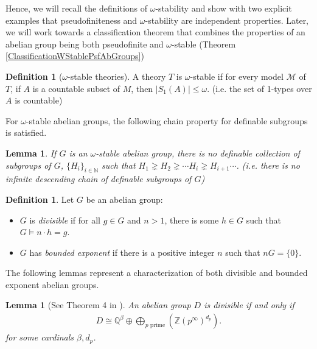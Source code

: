 \documentclass[11pt]{amsart}
\newtheorem{lema}[prop]{Lemma}
\theoremstyle{definition}
\newtheorem{definicion}[prop]{Definition}
\newcommand{\bd}{\begin{definicion}}
\newcommand{\ed}{\end{definicion}}
\newcommand{\bl}{\begin{lema}}
\newcommand{\el}{\end{lema}}
\begin{document}
Hence, we will recall the definitions of $\omega$-stability and show with two explicit examples that pseudofiniteness and $\omega$-stability are independent properties. Later, we will work towards a classification theorem that combines the properties of an abelian group being both pseudofinite and $\omega$-stable (Theorem \ref{ClassificationWStablePsfAbGroups})
\bd[$\omega$-stable theories] A theory $T$ is $\omega$-stable if for every model $\mathcal{M}$ of $T$, if $A$ is a countable subset of $M$, then $|S_1(A)|\leq\omega$. (i.e. the set of 1-types over $A$ is countable) 
\ed
For $\omega$-stable abelian groups, the following chain property for definable subgroups is satisfied.
\bl If $G$ is an $\omega$-stable abelian group, there is no definable collection of subgroups of $G$, $\{H_{i}\}_{i\in\mathbb{N}}$ such that $H_{1}\gneq H_{2}\gneq\cdots H_{i}\gneq H_{i+1}\cdots$. (i.e. there is no infinite descending chain of definable subgroups of $G$)
\label{CadenasDescenInfinitas}
\el
\bd Let $G$ be an abelian group:
\begin{itemize}
    \item $G$ is \textit{divisible} if for all $g\in G$ and $n>1$, there is some $h\in G$ such that $G\models n\cdot h=g$.
    \item $G$ has \textit{bounded exponent} if there is a positive integer $n$ such that $nG = \{0\}$.
\end{itemize}
\ed

The following lemmas represent a characterization of both divisible and bounded exponent abelian groups.
\bl[See Theorem 4 in \cite{kaplansky2018infinite}] An abelian group $D$ is divisible if and only if
\begin{align*}
    D\cong\mathbb{Q}^{\beta}\oplus\bigoplus\limits_{p \text{ prime}}(\mathbb{Z}(p^{\infty})^{d_{p}}).
\end{align*}
for some cardinals $\beta,d_{p}$.
\label{IsomorAbelianosDivisibles}
\el
\end{document}
